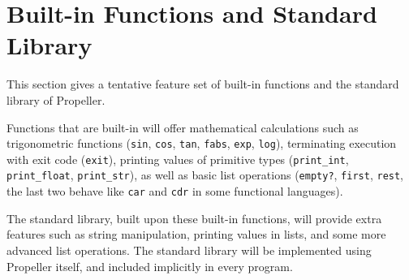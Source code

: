 \section{Built-in Functions and Standard Library}

This section gives a tentative feature set of built-in functions and the standard library of
Propeller.

Functions that are built-in will offer mathematical calculations such as trigonometric functions
(\verb|sin|, \verb|cos|, \verb|tan|, \verb|fabs|, \verb|exp|, \verb|log|),
terminating execution with exit code (\verb|exit|), printing values of primitive types
(\verb|print_int|, \verb|print_float|, \verb|print_str|),
as well as basic list operations (\verb|empty?|, \verb|first|, \verb|rest|, the last two behave
like \verb|car| and \verb|cdr| in some functional languages).

The standard library, built upon these built-in functions, will provide extra features such as
string manipulation, printing values in lists, and some more advanced list operations. The standard
library will be implemented using Propeller itself, and included implicitly in every program.
